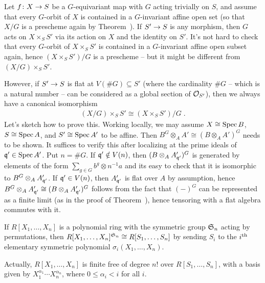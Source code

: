 \documentclass[a4paper,parskip=half,numbers=enddot, DIV=12]{scrreprt}
\renewcommand{\leq}{\leqslant}
\begin{document}
\begin{rem}
	Let $f\colon X\morphism S$ be a $G$-equivariant map with $G$ acting trivially on $S$, and assume that every $G$-orbit of $X$ is contained in a $G$-invariant affine open set (so that $X/G$ is a prescheme again by Theorem~). If $S'\morphism S$ is any morphism, then $G$ acts on $X\times_SS'$ via its action on $X$ and the identity on $S'$. It's not hard to check that every $G$-orbit of $X\times_SS'$ is contained in a $G$-invariant affine open subset again, hence $(X\times_SS')/G$ is a prescheme -- but it might be different from $(X/G)\times_SS'$.
	
	However, if $S'\morphism S$ is flat at $V(\# G)\subseteq S'$ (where the cardinality $\#G$ -- which is a natural number -- can be considered as a global section of $\mathcal{O}_{S'}$), then we always have a canonical isomorphism
	\begin{align*}
		(X/G)\times_SS'\cong (X\times_SS')/G\;.
	\end{align*}
	Let's sketch how to prove this. Working locally, we may assume $X\cong \operatorname{Spec} B$, $S\cong \operatorname{Spec} A$, and $S'\cong \operatorname{Spec} A'$ to be affine. Then $B^G\otimes_AA'\cong (B\otimes_AA')^G$ needs to be shown. It suffices to verify this after localizing at the prime ideals of $\mathfrak{q}'\in\operatorname{Spec} A'$. Put $n=\# G$. If $\mathfrak{q}'\notin V(n)$, then $(B\otimes_AA'_{\mathfrak{q}'})^G$ is generated by elements of the form $\sum_{g\in G}b^g\otimes n^{-1}a$ and its easy to check that it is isomorphic to $B^G\otimes_AA'_{\mathfrak{q}'}$. If $\mathfrak{q}'\in V(n)$, then $A'_{\mathfrak{q}'}$ is flat over $A$ by assumption, hence $B^G\otimes_AA'_{\mathfrak{q}'}\cong (B\otimes_AA'_{\mathfrak{q}'})^G$ follows from the fact that $(-)^G$ can be represented as a finite limit (as in the proof of Theorem~), hence tensoring with a flat algebra commutes with it.
\end{rem}
\begin{example}
	\begin{alphanumerate}
		\item {}If $R[X_1,\ldots,X_n]$ is a polynomial ring with the symmetric group $\mathfrak{S}_n$ acting by permutations, then $R[X_1,\ldots,X_n]^{\mathfrak{S}_n}\cong R[S_1,\ldots,S_n]$ by sending $S_i$ to the $i^{\text{th}}$ elementary symmetric polynomial $\sigma_i(X_1,\ldots,X_n)$. 
		\item Actually, $R[X_1,\ldots,X_n]$ is finite free of degree $n!$ over $R[S_1,\ldots,S_n]$, with a basis given by $X_1^{\alpha_1}\cdots X_n^{\alpha_n}$, where $0\leq \alpha_i< i$ for all $i$.
	\end{alphanumerate}
\end{example}
\end{document}
